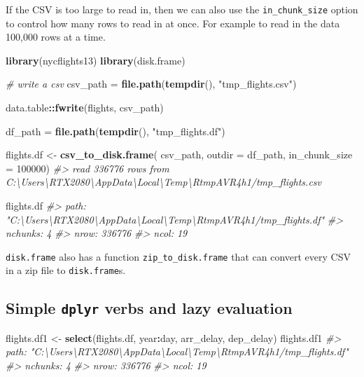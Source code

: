 \documentclass[]{book}
\newenvironment{Shaded}{\begin{snugshade}}{\end{snugshade}}
\newcommand{\CommentTok}[1]{\textcolor[rgb]{0.56,0.35,0.01}{\textit{#1}}}
\newcommand{\DataTypeTok}[1]{\textcolor[rgb]{0.13,0.29,0.53}{#1}}
\newcommand{\DecValTok}[1]{\textcolor[rgb]{0.00,0.00,0.81}{#1}}
\newcommand{\KeywordTok}[1]{\textcolor[rgb]{0.13,0.29,0.53}{\textbf{#1}}}
\newcommand{\NormalTok}[1]{#1}
\newcommand{\OperatorTok}[1]{\textcolor[rgb]{0.81,0.36,0.00}{\textbf{#1}}}
\newcommand{\StringTok}[1]{\textcolor[rgb]{0.31,0.60,0.02}{#1}}
\begin{document}
If the CSV is too large to read in, then we can also use the \texttt{in\_chunk\_size} option to control how many rows to read in at once. For example to read in the data 100,000 rows at a time.

\begin{Shaded}
\begin{Highlighting}[]
\KeywordTok{library}\NormalTok{(nycflights13)}
\KeywordTok{library}\NormalTok{(disk.frame)}

\CommentTok{# write a csv}
\NormalTok{csv_path =}\StringTok{ }\KeywordTok{file.path}\NormalTok{(}\KeywordTok{tempdir}\NormalTok{(), }\StringTok{"tmp_flights.csv"}\NormalTok{)}

\NormalTok{data.table}\OperatorTok{::}\KeywordTok{fwrite}\NormalTok{(flights, csv_path)}

\NormalTok{df_path =}\StringTok{ }\KeywordTok{file.path}\NormalTok{(}\KeywordTok{tempdir}\NormalTok{(), }\StringTok{"tmp_flights.df"}\NormalTok{)}

\NormalTok{flights.df <-}\StringTok{ }\KeywordTok{csv_to_disk.frame}\NormalTok{(}
\NormalTok{  csv_path, }
  \DataTypeTok{outdir =}\NormalTok{ df_path, }
  \DataTypeTok{in_chunk_size =} \DecValTok{100000}\NormalTok{)}
\CommentTok{#> read 336776 rows from C:\textbackslash{}Users\textbackslash{}RTX2080\textbackslash{}AppData\textbackslash{}Local\textbackslash{}Temp\textbackslash{}RtmpAVR4h1/tmp_flights.csv}
  
\NormalTok{flights.df}
\CommentTok{#> path: "C:\textbackslash{}Users\textbackslash{}RTX2080\textbackslash{}AppData\textbackslash{}Local\textbackslash{}Temp\textbackslash{}RtmpAVR4h1/tmp_flights.df"}
\CommentTok{#> nchunks: 4}
\CommentTok{#> nrow: 336776}
\CommentTok{#> ncol: 19}
\end{Highlighting}
\end{Shaded}

\texttt{disk.frame} also has a function \texttt{zip\_to\_disk.frame} that can convert every CSV in a zip file to \texttt{disk.frame}s.

\hypertarget{simple-dplyr-verbs-and-lazy-evaluation}{%
\subsection{\texorpdfstring{Simple \texttt{dplyr} verbs and lazy evaluation}{Simple dplyr verbs and lazy evaluation}}\label{simple-dplyr-verbs-and-lazy-evaluation}}

\begin{Shaded}
\begin{Highlighting}[]
\NormalTok{flights.df1 <-}\StringTok{ }\KeywordTok{select}\NormalTok{(flights.df, year}\OperatorTok{:}\NormalTok{day, arr_delay, dep_delay)}
\NormalTok{flights.df1}
\CommentTok{#> path: "C:\textbackslash{}Users\textbackslash{}RTX2080\textbackslash{}AppData\textbackslash{}Local\textbackslash{}Temp\textbackslash{}RtmpAVR4h1/tmp_flights.df"}
\CommentTok{#> nchunks: 4}
\CommentTok{#> nrow: 336776}
\CommentTok{#> ncol: 19}
\end{Highlighting}
\end{Shaded}
\end{document}
